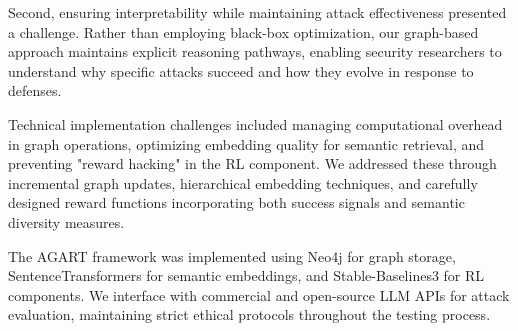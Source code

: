 Second, ensuring interpretability while maintaining attack effectiveness presented a challenge. Rather than employing black-box optimization, our graph-based approach maintains explicit reasoning pathways, enabling security researchers to understand why specific attacks succeed and how they evolve in response to defenses.

Technical implementation challenges included managing computational overhead in graph operations, optimizing embedding quality for semantic retrieval, and preventing "reward hacking" in the RL component. We addressed these through incremental graph updates, hierarchical embedding techniques, and carefully designed reward functions incorporating both success signals and semantic diversity measures.

The AGART framework was implemented using Neo4j for graph storage, SentenceTransformers for semantic embeddings, and Stable-Baselines3 for RL components. We interface with commercial and open-source LLM APIs for attack evaluation, maintaining strict ethical protocols throughout the testing process. 